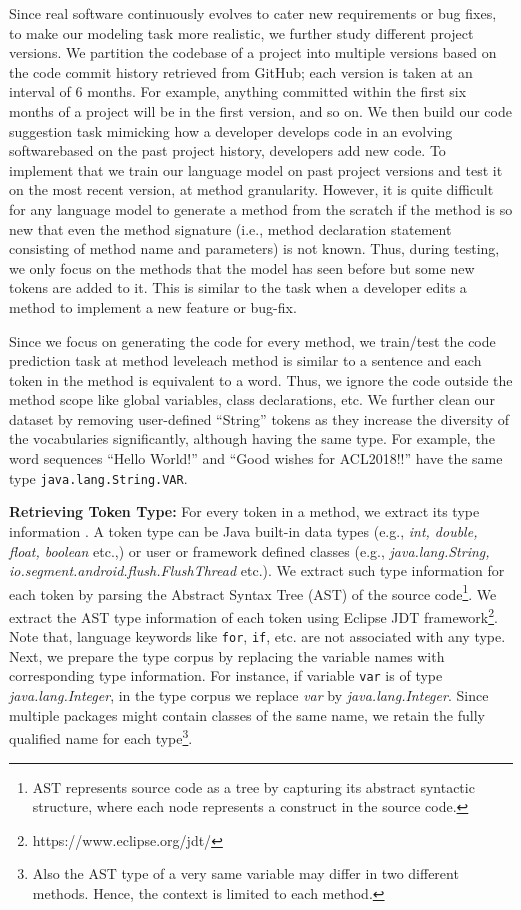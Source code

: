 \documentclass[11pt,a4paper]{article}
\begin{document}
Since real software continuously evolves to cater new requirements or bug fixes, to make our modeling task more realistic, we further study different project versions. We partition the codebase of a project into multiple versions based on the code commit history retrieved from GitHub; each version is taken at an interval of 6 months. For example, anything committed within the first six months of a project will be in the first version, and so on. We then build our code suggestion task mimicking how a developer develops code in an evolving software\textemdash based on the past project history, developers add new code. To implement that we train our language model on past project versions and test it on the most recent version, at method granularity. However, it is quite difficult for any language model to generate a method from the scratch if the method is so new that even the method signature (i.e., method declaration statement consisting of method name and parameters) is not known. Thus, during testing, we only focus on the methods that the model has seen before but some new tokens are added to it. This is similar to the task when a developer edits a method to implement a new feature or bug-fix.

Since we focus on generating the code for every method, we train/test the code prediction task at method level\textemdash each method is similar to a sentence and each token in the method is equivalent to a word. Thus, we ignore the code outside the method scope like global variables, class declarations, etc. We further clean our dataset by removing user-defined ``String'' tokens as they increase the diversity of the vocabularies significantly, although having the same type.  For example, the word sequences ``Hello World!'' and  ``Good wishes for ACL2018!!'' have the same type {\tt java.lang.String.VAR}. 




\textbf{Retrieving Token Type:} 
For every token  in a method, we extract its type information . A token type can be Java built-in data types (e.g., \textit{int, double, float, boolean} etc.,) or user or framework defined classes (e.g., {\it java.lang.String, io.segment.android.flush.FlushThread} etc.). We extract such type information for each token by parsing the Abstract Syntax Tree (AST) of the source code\footnote{AST represents source code as a tree by capturing its abstract syntactic structure, where each node represents a construct in the source code.}. We extract the  AST type information of each token using Eclipse JDT framework\footnote{https://www.eclipse.org/jdt/}. Note that, language keywords like {\tt for}, {\tt if}, etc. are not associated with any type. 
Next, we prepare the type corpus by replacing the variable names with corresponding type information. For instance, if variable {\tt var} is of type {\it java.lang.Integer}, in the type corpus we replace {\it var} by {\it java.lang.Integer}. Since multiple packages might contain classes of the same name, we retain the fully qualified name for each type\footnote{Also the AST type of a very same variable may differ in two different methods. Hence, the context is limited to each method.}.
\end{document}
